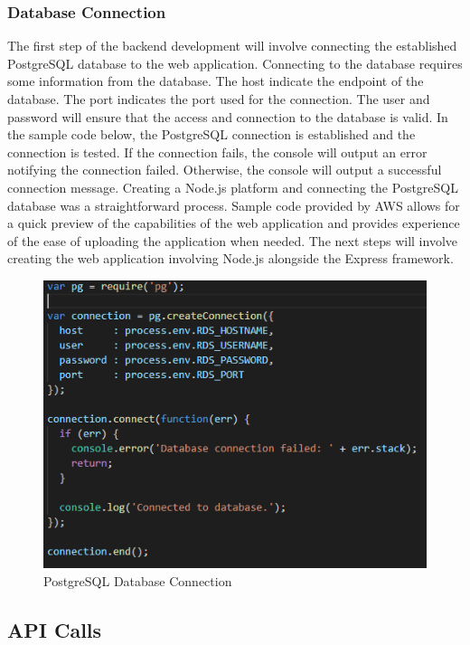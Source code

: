 \documentclass[12pt]{report}
\begin{document}
\begin{enumerate}
\subsubsection{Database Connection}

The first step of the backend development will involve connecting the established PostgreSQL database to the web application.  Connecting to the database requires some information from the database.  The host indicate the endpoint of the database.  The port indicates the port used for the connection.  The user and password will ensure that the access and connection to the database is valid.  In the sample code below, the PostgreSQL connection is established and the connection is tested.  If the connection fails, the console will output an error notifying the connection failed. Otherwise, the console will output a successful connection message.
Creating a Node.js platform and connecting the PostgreSQL database was a straightforward process.  Sample code provided by AWS allows for a quick preview of the capabilities of the web application and provides experience of the ease of uploading the application when needed.
The next steps will involve creating the web application involving Node.js alongside the Express framework.

\begin{figure}[h]
	\centering
	\includegraphics[scale=0.5]{database_connection}
	\caption{PostgreSQL Database Connection}
	\label{fig:javascripthttprequest}
\end{figure}

\subsection*{API Calls}


\end{enumerate}
\end{document}
